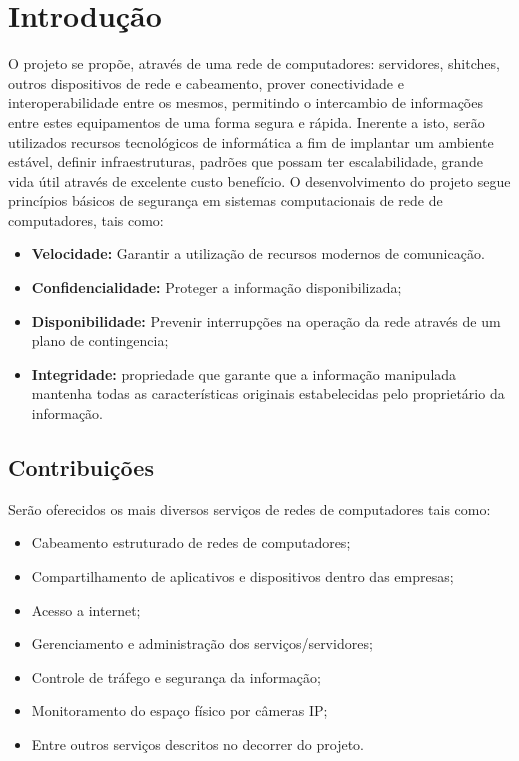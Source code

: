 \documentclass[	DIV=calc,%
							paper=a4,%
							fontsize=12pt,%
							onecolumn]{scrartcl}	 					%
\begin{document}
\section{Introdução}
O projeto se propõe, através de uma rede de computadores: servidores, shitches, outros dispositivos de rede e cabeamento, prover conectividade e interoperabilidade entre os mesmos, permitindo o intercambio de informações entre estes equipamentos de uma forma segura e rápida. Inerente a isto, serão utilizados recursos tecnológicos de informática a fim de implantar um ambiente estável, definir infraestruturas, padrões que possam ter escalabilidade, grande vida útil através de excelente custo benefício. O desenvolvimento do projeto segue princípios básicos de segurança em sistemas computacionais de rede de computadores, tais como: 
\begin{itemize}
\item \textbf{Velocidade:} Garantir a utilização de recursos modernos de comunicação. 
\item \textbf{Confidencialidade:} Proteger a informação disponibilizada; 
\item  \textbf{Disponibilidade:} Prevenir interrupções na operação da rede através de um plano de contingencia;
\item \textbf{Integridade:} propriedade que garante que a informação manipulada mantenha todas as características originais estabelecidas pelo proprietário da informação.
\end{itemize}
\subsection{Contribuições}
Serão oferecidos os mais diversos serviços de redes de computadores tais como: 
\begin{itemize}
\item Cabeamento estruturado de redes de computadores;
\item Compartilhamento de aplicativos e dispositivos dentro das empresas; 
\item Acesso a internet;
\item Gerenciamento e administração dos serviços/servidores;
\item Controle de tráfego e segurança da informação; 
\item Monitoramento do espaço físico por câmeras IP;
\item Entre outros serviços descritos no decorrer do projeto.
\end{itemize}	
\end{document}

